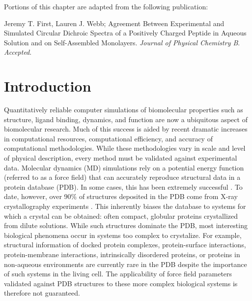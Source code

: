 Portions of this chapter are adapted from the following publication: 

\noindent Jeremy T. First, Lauren J. Webb; Agreement Between Experimental and Simulated Circular Dichroic Spectra of a Positively Charged Peptide in Aqueous Solution and on Self-Assembled Monolayers. \emph{Journal of Physical Chemistry B}. \emph{Accepted}.

\section{Introduction}

Quantitatively reliable computer simulations of biomolecular properties such as structure, ligand binding, dynamics, and function are now a ubiquitous aspect of biomolecular research. 
Much of this success is aided by recent dramatic increases in computational resources, computational efficiency, and accuracy of computational methodologies. 
While these methodologies vary in scale and level of physical description, every method must be validated against experimental data. 
Molecular dynamics (MD) simulations rely on a potential energy function (referred to as a force field) that can accurately reproduce structural data in a protein database (PDB). 
In some cases, this has been extremely successful \cite{Duan1998, Lindorff-Larsen2011, Bowman2011, Voelz2012, Shaw2010, Lane2013, Koukos2014a}.
To date, however, over 90\% of structures deposited in the PDB come from X-ray crystallography experiments \cite{Berman2000}. 
This inherently biases the database to systems for which a crystal can be obtained: often compact, globular proteins crystallized from dilute solutions. 
While such structures dominate the PDB, most interesting biological phenomena occur in systems too complex to crystalize. 
For example, structural information of docked protein complexes, protein-surface interactions, protein-membrane interactions, intrinsically disordered proteins, or proteins in non-aqueous environments are currently rare in the PDB\cite{Berman2013} despite the importance of such systems in the living cell. 
The applicability of force field parameters validated against PDB structures to these more complex biological systems is therefore not guaranteed.

